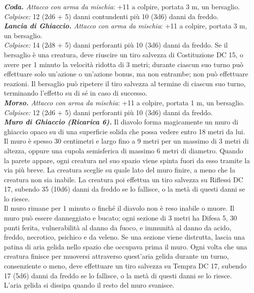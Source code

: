\begin{multicols}{2}
\emph{\textbf{Coda.} Attacco con arma da mischia}: +11 a colpire, portata 3 m, un bersaglio.\\
\emph{Colpisce:} 12 (2d6 + 5) danni contundenti più 10 (3d6) danni da freddo.\\
\emph{\textbf{Lancia di Ghiaccio.} Attacco con arma da mischia}: +11 a colpire, portata 3 m, un bersaglio.\\
\emph{Colpisce:} 14 (2d8 + 5) danni perforanti più 10 (3d6) danni da freddo. Se il bersaglio è una creatura, deve riuscire un tiro salvezza di Costituzione DC 15, o avere per 1 minuto la velocità ridotta di 3 metri; durante ciascun suo turno può effettuare solo un'azione o un'azione bonus, ma non entrambe; non può effettuare reazioni. Il bersaglio può ripetere il tiro salvezza al termine di ciascun suo turno, terminando l'effetto su di sé in caso di successo.\\
\emph{\textbf{Morso.} Attacco con arma da mischia}: +11 a colpire, portata 1 m, un bersaglio.\\
\emph{Colpisce:} 12 (2d6 + 5) danni perforanti più 10 (3d6) danni da freddo.\\
\emph{\textbf{Muro di Ghiaccio (Ricarica 6).}} Il diavolo forma magicamente un muro di ghiaccio opaco su di una superficie solida che possa vedere entro 18 metri da lui. Il muro è spesso 30 centimetri e largo fino a 9 metri per un massimo di 3 metri di altezza, oppure una cupola semisferica di massimo 6 metri di diametro. Quando la parete appare, ogni creatura nel suo spazio viene spinta fuori da esso tramite la via più breve. La creatura sceglie su quale lato del muro finire, a meno che la creatura non sia inabile. La creatura poi effettua un tiro salvezza su Riflessi DC 17, subendo 35 (10d6) danni da freddo se lo fallisce, o la metà di questi danni se lo riesce.\\
Il muro rimane per 1 minuto o finché il diavolo non è reso inabile o muore. Il muro può essere danneggiato e bucato; ogni sezione di 3 metri ha Difesa 5, 30 punti ferita, vulnerabilità al danno da fuoco, e immunità al danno da acido, freddo, necrotico, psichico e da veleno. Se una sezione viene distrutta, lascia una patina di aria gelida nello spazio che occupava prima il muro. Ogni volta che una creatura finisce per muoversi attraverso quest'aria gelida durante un turno, consenziente o meno, deve effettuare un tiro salvezza su Tempra DC 17, subendo 17 (5d6) danni da freddo se lo fallisce, o la metà di questi danni se lo riesce. \\
L'aria gelida si dissipa quando il resto del muro svanisce.\\



\end{multicols}
